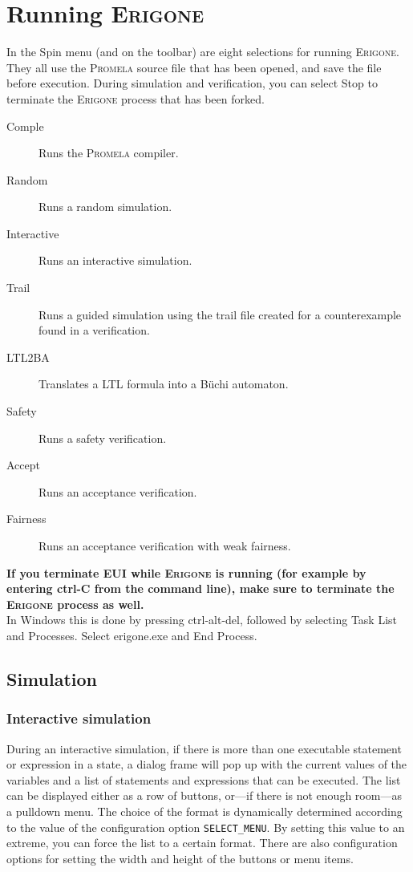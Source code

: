 \documentclass[11pt]{article}
\newcommand{\eri}{\textsc{Erigone}}
\newcommand{\prm}{\textsc{Promela}}
\newcommand{\eui}{\textsc{EUI}}
\newcommand{\p}[1]{\texttt{#1}}
\newcommand{\bu}[1]{\textsf{#1}}
\begin{document}
\section{Running \eri{}}\label{s.run}
In the \bu{Spin} menu (and on the toolbar) are eight selections for
running \eri{}. They all use the \prm{} source file that has been opened,
and save the file before execution.
During simulation and verification,
you can select \bu{Stop} to terminate the \eri{} process that has been forked.
\begin{description}
\item[\bu{Comple}] Runs the \prm{} compiler.
\item[\bu{Random}] Runs a random simulation.
\item[\bu{Interactive}] Runs an interactive simulation.
\item[\bu{Trail}] Runs a guided simulation using the trail
file created for a counterexample found in a verification.
\item[\bu{LTL2BA}] Translates a LTL formula into a B\"{u}chi automaton.
\item[\bu{Safety}] Runs a safety verification.
\item[\bu{Accept}] Runs an acceptance verification.
\item[\bu{Fairness}] Runs an acceptance verification with weak fairness.
\end{description}
\textbf{If you terminate \eui{} while \eri{} is running (for example by entering \bu{ctrl-C} from the
command line), make sure to terminate the \eri{} process as well.}\\
In Windows this is done by pressing \bu{ctrl-alt-del}, followed by
selecting \bu{Task List} and \bu{Processes}. Select \bu{erigone.exe} and
\bu{End Process}.

\subsection{Simulation}\label{s.sim}

\subsubsection{Interactive simulation}

During an interactive simulation, if there is more than one executable
statement or expression in a state, a dialog frame will pop up with the
current values of the variables and a list of statements and expressions
that can be executed. The list can be displayed either as a row of
buttons, or---if there is not enough room---as a pulldown menu. The
choice of the format is dynamically determined according to the value of
the configuration option \p{SELECT\_MENU}. By setting this value to an
extreme, you can force the list to a certain format. There are also
configuration options for setting the width and height of the buttons or
menu items.
\end{document}
